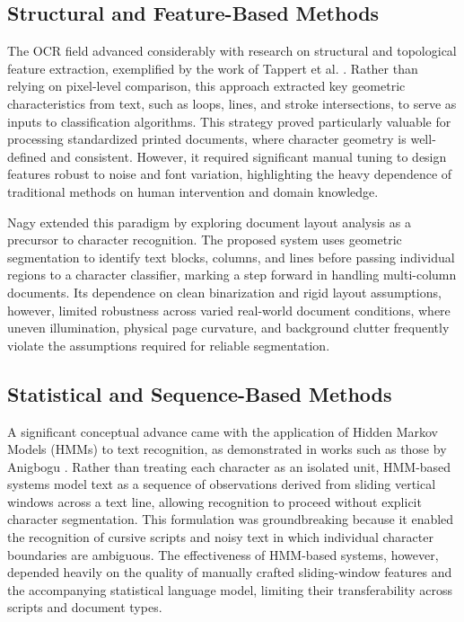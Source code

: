 \subsection{Structural and Feature-Based Methods}

The OCR field advanced considerably with research on structural and topological feature extraction, exemplified by the work of Tappert et al. \cite{Tappert1990}. Rather than relying on pixel-level comparison, this approach extracted key geometric characteristics from text, such as loops, lines, and stroke intersections, to serve as inputs to classification algorithms. This strategy proved particularly valuable for processing standardized printed documents, where character geometry is well-defined and consistent. However, it required significant manual tuning to design features robust to noise and font variation, highlighting the heavy dependence of traditional methods on human intervention and domain knowledge.

Nagy \cite{Nagy2000} extended this paradigm by exploring document layout analysis as a precursor to character recognition. The proposed system uses geometric segmentation to identify text blocks, columns, and lines before passing individual regions to a character classifier, marking a step forward in handling multi-column documents. Its dependence on clean binarization and rigid layout assumptions, however, limited robustness across varied real-world document conditions, where uneven illumination, physical page curvature, and background clutter frequently violate the assumptions required for reliable segmentation.

\subsection{Statistical and Sequence-Based Methods}

A significant conceptual advance came with the application of Hidden Markov Models (HMMs) to text recognition, as demonstrated in works such as those by Anigbogu \cite{Anigbogu1995}. Rather than treating each character as an isolated unit, HMM-based systems model text as a sequence of observations derived from sliding vertical windows across a text line, allowing recognition to proceed without explicit character segmentation. This formulation was groundbreaking because it enabled the recognition of cursive scripts and noisy text in which individual character boundaries are ambiguous. The effectiveness of HMM-based systems, however, depended heavily on the quality of manually crafted sliding-window features and the accompanying statistical language model, limiting their transferability across scripts and document types.

